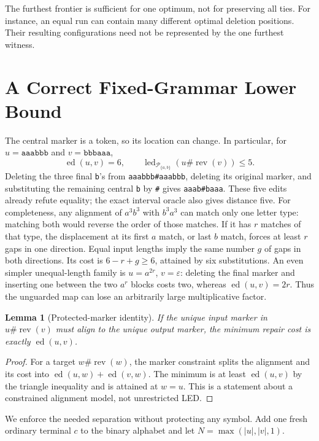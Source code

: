 \documentclass[sigconf,screen]{acmart}
\newcommand{\ED}{\operatorname{ed}}
\newcommand{\LED}{\operatorname{led}}
\newcommand{\rev}{\operatorname{rev}}
\newcommand{\Pal}{\mathcal P}
\newcommand{\eps}{\varepsilon}
\newtheorem{lemma}[theorem]{Lemma}
\theoremstyle{definition}
\begin{document}
The furthest frontier is sufficient for one optimum, not for preserving all ties. For instance, an equal run can contain many different optimal deletion positions. Their resulting configurations need not be represented by the one furthest witness.

\section{A Correct Fixed-Grammar Lower Bound}\label{sec:lower}
The central marker is a token, so its location can change. In particular, for $u=\texttt{aaabbb}$ and $v=\texttt{bbbaaa}$,
\begin{equation}\label{eq:counter}
 \ED(u,v)=6,\qquad
 \LED_{\Pal_{\{a,b\}}}(u\#\rev(v))\le5.
\end{equation}
Deleting the three final \texttt{b}'s from \texttt{aaabbb\#aaabbb}, deleting its original marker, and substituting the remaining central \texttt{b} by \texttt{\#} gives \texttt{aaab\#baaa}. These five edits already refute equality; the exact interval oracle also gives distance five. For completeness, any alignment of $a^3b^3$ with $b^3a^3$ can match only one letter type: matching both would reverse the order of those matches. If it has $r$ matches of that type, the displacement at its first $a$ match, or last $b$ match, forces at least $r$ gaps in one direction. Equal input lengths imply the same number $g$ of gaps in both directions. Its cost is $6-r+g\ge6$, attained by six substitutions. An even simpler unequal-length family is $u=a^{2r}$, $v=\eps$: deleting the final marker and inserting one between the two $a^r$ blocks costs two, whereas $\ED(u,v)=2r$. Thus the unguarded map can lose an arbitrarily large multiplicative factor.

\begin{lemma}[Protected-marker identity]\label{lem:protected}
If the unique input marker in $u\#\rev(v)$ must align to the unique output marker, the minimum repair cost is exactly $\ED(u,v)$.
\end{lemma}
\begin{proof}
For a target $w\#\rev(w)$, the marker constraint splits the alignment and its cost into $\ED(u,w)+\ED(v,w)$. The minimum is at least $\ED(u,v)$ by the triangle inequality and is attained at $w=u$. This is a statement about a constrained alignment model, not unrestricted LED.
\end{proof}

We enforce the needed separation without protecting any symbol. Add one fresh ordinary terminal $c$ to the binary alphabet and let $N=\max(|u|,|v|,1)$.
\end{document}
